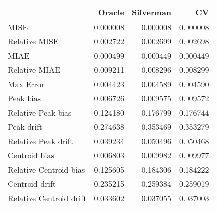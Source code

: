 \begin{tabular}{lrrr}
  \hline
 & Oracle & Silverman & CV \\ 
  \hline
MISE & 0.000008 & 0.000008 & 0.000008 \\ 
  Relative MISE & 0.002722 & 0.002699 & 0.002698 \\ 
  MIAE & 0.000499 & 0.000449 & 0.000449 \\ 
  Relative MIAE & 0.009211 & 0.008296 & 0.008299 \\ 
  Max Error & 0.004423 & 0.004589 & 0.004590 \\ 
  Peak bias & 0.006726 & 0.009575 & 0.009572 \\ 
  Relative Peak bias & 0.124180 & 0.176799 & 0.176744 \\ 
  Peak drift & 0.274638 & 0.353469 & 0.353279 \\ 
  Relative Peak drift & 0.039234 & 0.050496 & 0.050468 \\ 
  Centroid bias & 0.006803 & 0.009982 & 0.009977 \\ 
  Relative Centroid bias & 0.125605 & 0.184306 & 0.184222 \\ 
  Centroid drift & 0.235215 & 0.259384 & 0.259019 \\ 
  Relative Centroid drift & 0.033602 & 0.037055 & 0.037003 \\ 
   \hline
\end{tabular}
